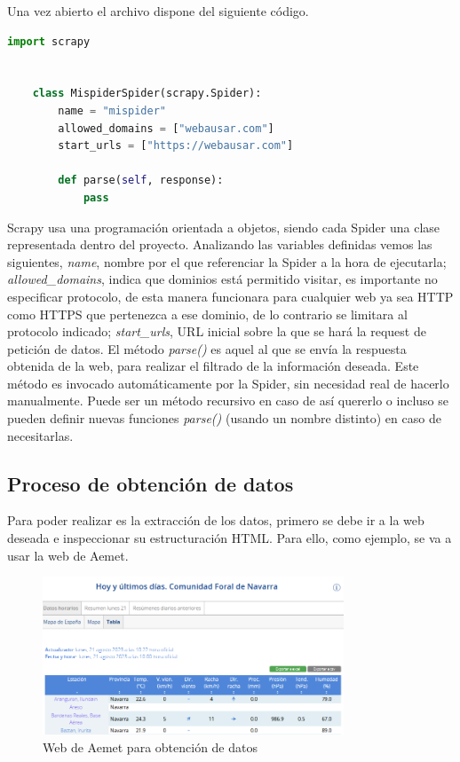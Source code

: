 Una vez abierto el archivo dispone del siguiente código.

\begin{lstlisting}[language=Python, caption={Spider recién generada}]
	import scrapy
	
	
	class MispiderSpider(scrapy.Spider):
		name = "mispider"
		allowed_domains = ["webausar.com"]
		start_urls = ["https://webausar.com"]
	
		def parse(self, response):
			pass
\end{lstlisting}

Scrapy usa una programación orientada a objetos, siendo cada Spider una clase representada dentro del proyecto.\newline
\newline
Analizando las variables definidas vemos las siguientes, \textit{name}, nombre por el que referenciar la Spider a la hora de ejecutarla; \textit{allowed\_domains}, indica que dominios está permitido visitar, es importante no especificar protocolo, de esta manera funcionara para cualquier web ya sea HTTP como HTTPS que pertenezca a ese dominio, de lo contrario se limitara al protocolo indicado; \textit{start\_urls}, URL inicial sobre la que se hará la request de petición de datos.\newline
\newline
El método \textit{parse()} es aquel al que se envía la respuesta obtenida de la web, para realizar el filtrado de la información deseada. Este método es invocado automáticamente por la Spider, sin necesidad real de hacerlo manualmente. Puede ser un método recursivo en caso de así quererlo o incluso se pueden definir nuevas funciones \textit{parse()} (usando un nombre distinto) en caso de necesitarlas.

\subsection{Proceso de obtención de datos}
Para poder realizar es la extracción de los datos, primero se debe ir a la web deseada e inspeccionar su estructuración HTML. Para ello, como ejemplo, se va a usar la web de Aemet.\newline

\begin{figure} [H]
	\centering
	\includegraphics[width=0.8\textwidth]{fig/AemetCode.png}
	\caption[URL de inicio para obtener los códigos de las estaciones de Aemet]{Web de Aemet para obtención de datos}
	\label{fig:ej13}
\end{figure}

